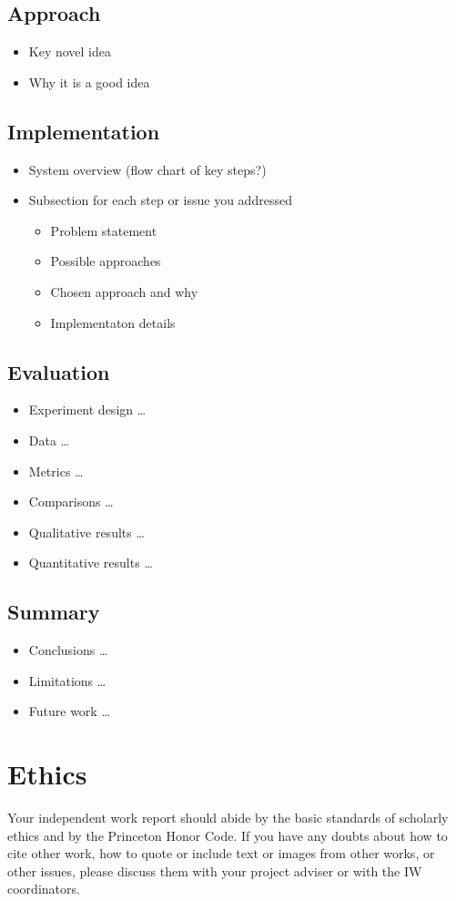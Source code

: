 \documentclass[pageno]{jpaper}
\begin{document}
\subsection{Approach}
\begin{itemize}
\item Key novel idea
\item Why it is a good idea
\end{itemize}

\subsection{Implementation}
\begin{itemize}
\item System overview (flow chart of key steps?)
\item Subsection for each step or issue you addressed
\begin{itemize}
\item Problem statement
\item Possible approaches
\item Chosen approach and why
\item Implementaton details
\end{itemize}
\end{itemize}

\subsection{Evaluation}
\begin{itemize}
\item Experiment design \ldots
\item Data \ldots
\item Metrics \ldots
\item Comparisons \ldots
\item Qualitative results \ldots
\item Quantitative results \ldots
\end{itemize}

\subsection{Summary}
\begin{itemize}
\item Conclusions \ldots
\item Limitations \ldots
\item Future work \ldots
\end{itemize}


\section{Ethics}

Your independent work report should abide by the basic standards of scholarly ethics and by the Princeton Honor Code. If you have any doubts about how to cite
other work, how to quote or include text or images from other works, or other issues, please discuss them with your project adviser or with the IW coordinators.





\end{document}
